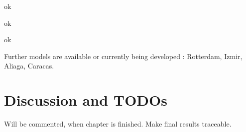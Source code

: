  ok

 ok

 \clearpage

 ok

 \clearpage

 \clearpage

Further models are available or currently being developed \citep[][]{Axhausen_unpub_Hong_Kong_2013, MATSIM-T-Scenarios_Webpage_2014}: Rotterdam, Izmir, Aliaga, Caracas.

\section{Discussion and TODOs}
Will be commented, when chapter is finished. Make final results traceable.

%
%
%
%
%


